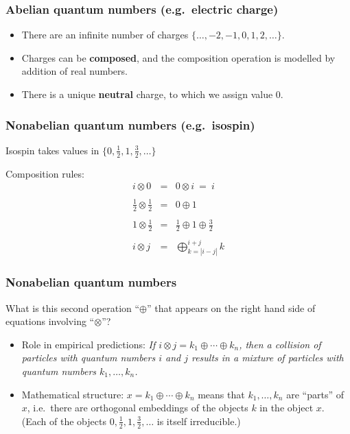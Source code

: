\documentclass{beamer}
\begin{document}
\begin{frame}
  \frametitle{Abelian quantum numbers (e.g.\ electric charge)}
\begin{itemize}
\item There are an infinite number of charges $\{ \dots
  ,-2,-1,0,1,2,\dots \}$.
\item Charges can be \textbf{composed}, and the composition operation
  is modelled by addition of real numbers.  
\item There is a unique \textbf{neutral} charge, to which we assign
  value $0$.
\end{itemize}
\end{frame}



\begin{frame}
  \frametitle{Nonabelian quantum numbers (e.g.\ isospin)}
Isospin takes values in $\{ 0,\frac{1}{2},1,\frac{3}{2},\dots \}$

Composition rules:
\begin{eqnarray*} 
i\otimes 0 &=& 0\otimes i \:=\: i \\ \\
\textstyle \frac{1}{2}\otimes \frac{1}{2}& =& 0\oplus 1 \\ \\
\textstyle 1\otimes \frac{1}{2}&=& \textstyle \frac{1}{2}\oplus 1 \oplus
\frac{3}{2} \\ \\
i\otimes j &= & \bigoplus _{k=|i-j|}^{i+j}k \end{eqnarray*}
\end{frame}


\begin{frame}
\frametitle{Nonabelian quantum numbers}
What is this second operation ``$\oplus$'' that appears on the right
hand side of equations involving ``$\otimes$''? \pause
\begin{itemize} 
\item Role in empirical predictions: \newline \textit{If $i\otimes
    j=k_1\oplus \cdots \oplus k_n$, then a collision of particles with
    quantum numbers $i$ and $j$ results in a mixture of particles with
    quantum numbers $k_1,\dots ,k_n$.} \pause
\item Mathematical structure: \newline $x=k_1\oplus \cdots \oplus k_n$
  means that $k_1,\dots ,k_n$ are ``parts'' of $x$, i.e.\ there are
  orthogonal embeddings of the objects $k$ in the object $x$.  (Each
  of the objects $0,\frac{1}{2},1,\frac{3}{2},\dots$ is itself
  irreducible.) \pause
\end{itemize}

\end{frame}
\end{document}
